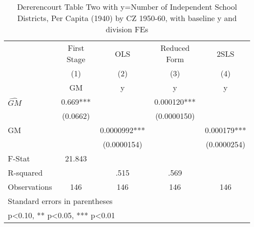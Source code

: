 \begin{table}[htbp]\centering
\def\sym#1{\ifmmode^{#1}\else\(^{#1}\)\fi}
\caption{Dererencourt Table Two with y=Number of Independent School Districts, Per Capita (1940) by CZ 1950-60, with baseline y and division FEs}
\begin{tabular}{l*{4}{c}}
\toprule
                    & First Stage   &         OLS   &Reduced Form   &        2SLS   \\
                    &\multicolumn{1}{c}{(1)}&\multicolumn{1}{c}{(2)}&\multicolumn{1}{c}{(3)}&\multicolumn{1}{c}{(4)}\\
                    &\multicolumn{1}{c}{GM}&\multicolumn{1}{c}{y}&\multicolumn{1}{c}{y}&\multicolumn{1}{c}{y}\\
\midrule
$\hat{GM}$          &       0.669***&               &    0.000120***&               \\
                    &    (0.0662)   &               & (0.0000150)   &               \\
\addlinespace
GM                  &               &   0.0000992***&               &    0.000179***\\
                    &               & (0.0000154)   &               & (0.0000254)   \\
\midrule
F-Stat              &      21.843   &               &               &               \\
R-squared           &               &        .515   &        .569   &               \\
Observations        &         146   &         146   &         146   &         146   \\
\bottomrule
\multicolumn{5}{l}{\footnotesize Standard errors in parentheses}\\
\multicolumn{5}{l}{\footnotesize * p<0.10, ** p<0.05, *** p<0.01}\\
\end{tabular}
\end{table}
